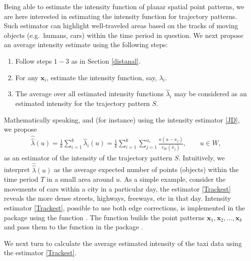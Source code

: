\documentclass[article]{jss}
\begin{document}
  Being able to estimate the intensity function of planar spatial point patterns, we are here interested in estimating the intensity function for trajectory patterns. Such estimator can highlight well-traveled areas based on the tracks of moving objects (e.g.\ humans, cars) within the time period in question. We next propose an average intensity estimate using the following steps:
  \begin{leftbar}
  \begin{enumerate}
  \item Follow steps $1-3$ as in Section \ref{distanal}.
  \item For any $\mathbf{x}_i$, estimate the intensity function, say, $\lambda_i$.
  \item The average over all estimated intensity functions $\widehat{\lambda}_i$ may be considered as an estimated intensity for the trajectory pattern $S$.
  \end{enumerate}
  \end{leftbar}
  Mathematically speaking, and (for instance) using the intensity estimator \eqref{JD}, we propose
  \begin{eqnarray}\label{Trackest}
  \widehat{\widehat{\lambda}}(u)=\frac{1}{k} \sum\limits_{i=1}^{k} \widehat{\lambda}_i(u) =\frac{1}{k}\sum\limits_{i=1}^{k} \sum\limits_{j=1}^{n_i} \frac{\kappa(u-x_j)}{c_W(x_j)}, \qquad u \in W,
  \end{eqnarray}
  as an estimator of the intensity of the trajectory pattern $S$. Intuitively, we interpret $\widehat{\widehat{\lambda}}(u)$ as the average expected number of points (objects) within the time period $T$ in a small area around $u$. As a simple example, consider the movements of cars within a city in a particular day, the estimator \eqref{Trackest} reveals the more dense streets, highways, freeways, etc in that day. Intensity estimator \eqref{Trackest}, possible to use both edge corrections, is implemented in the  package using the function . The function  builds the point patterns $\mathbf{x}_1,\mathbf{x}_2, \ldots, \mathbf{x}_k$ and pass them to the function  in the package .

We next turn to calculate the average estimated intensity of the taxi data using the estimator \eqref{Trackest}.
\end{document}
